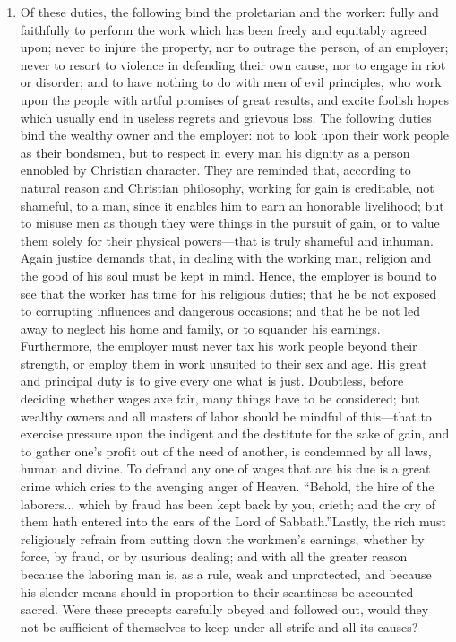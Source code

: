 \documentclass{book}
\begin{document}
\begin{enumerate}
	\item Of these duties, the following bind the proletarian and the worker: fully and faithfully to perform the work which has been freely and equitably agreed upon; never to injure the property, nor to outrage the person, of an employer; never to resort to violence in defending their own cause, nor to engage in riot or disorder; and to have nothing to do with men of evil principles, who work upon the people with artful promises of great results, and excite foolish hopes which usually end in useless regrets and grievous loss. The following duties bind the wealthy owner and the employer: not to look upon their work people as their bondsmen, but to respect in every man his dignity as a person ennobled by Christian character. They are reminded that, according to natural reason and Christian philosophy, working for gain is creditable, not shameful, to a man, since it enables him to earn an honorable livelihood; but to misuse men as though they were things in the pursuit of gain, or to value them solely for their physical powers—that is truly shameful and inhuman. Again justice demands that, in dealing with the working man, religion and the good of his soul must be kept in mind. Hence, the employer is bound to see that the worker has time for his religious duties; that he be not exposed to corrupting influences and dangerous occasions; and that he be not led away to neglect his home and family, or to squander his earnings. Furthermore, the employer must never tax his work people beyond their strength, or employ them in work unsuited to their sex and age. His great and principal duty is to give every one what is just. Doubtless, before deciding whether wages axe fair, many things have to be considered; but wealthy owners and all masters of labor should be mindful of this—that to exercise pressure upon the indigent and the destitute for the sake of gain, and to gather one’s profit out of the need of another, is condemned by all laws, human and divine. To defraud any one of wages that are his due is a great crime which cries to the avenging anger of Heaven. “Behold, the hire of the laborers... which by fraud has been kept back by you, crieth; and the cry of them hath entered into the ears of the Lord of Sabbath.”\footnotemark[5] Lastly, the rich must religiously refrain from cutting down the workmen’s earnings, whether by force, by fraud, or by usurious dealing; and with all the greater reason because the laboring man is, as a rule, weak and unprotected, and because his slender means should in proportion to their scantiness be accounted sacred. Were these precepts carefully obeyed and followed out, would they not be sufficient of themselves to keep under all strife and all its causes?



\end{enumerate}
\end{document}
